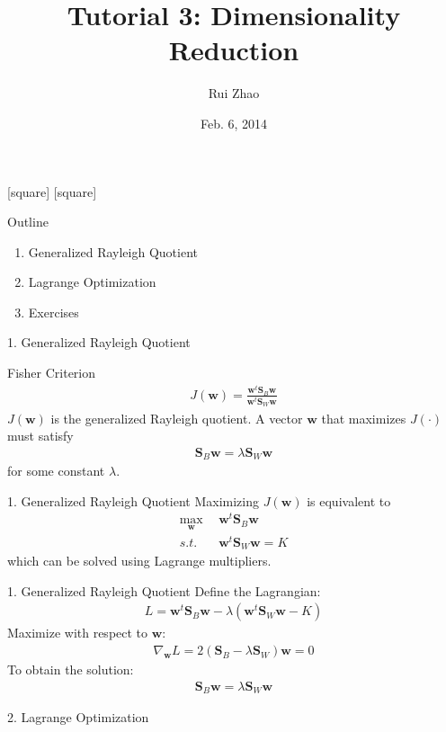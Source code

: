 \documentclass[compress,blue]{beamer}
\title[ENGG 5202 Pattern Recogntion Tutorial 3]{Tutorial 3: Dimensionality Reduction}
\author{Rui Zhao}
\institute{rzhao@ee.cuhk.edu.hk}
\date{Feb. 6, 2014}
\newcommand{\bw}{\mathbf{w}}
\newcommand{\bS}{\mathbf{S}}
\begin{document}
\begin{frame}
\titlepage
\end{frame}

[square]
[square]

\begin{frame}{Outline}
	\begin{enumerate}
		\item<1-2> Generalized Rayleigh Quotient 
		\vspace{0.1in}
		\item<1> Lagrange Optimization
		\vspace{0.1in}
		\item<1> Exercises 
	\end{enumerate}
\end{frame}

\begin{frame}{1. Generalized Rayleigh Quotient }
	\begin{block}{Fisher Criterion}
		\begin{align}
			J(\bw) = \frac{\bw^t  \bS_B \bw}{\bw^t \bS_W \bw}
		\end{align}
		$J(\bw)$ is the generalized Rayleigh quotient. A vector $\bw$ that maximizes $J(\cdot)$ must satisfy 
		\begin{align}
			\bS_B\bw = \lambda\bS_W\bw
		\end{align}
		for some constant $\lambda$.
	\end{block}	
\end{frame}

\begin{frame}{1. Generalized Rayleigh Quotient}
	Maximizing $J(\bw)$ is equivalent to 
	\begin{align}
		\max_{\bw} ~~& \bw^t \bS_B \bw \\
		s.t. ~~~& \bw^t \bS_W \bw = K
	\end{align}
	which can be solved using Lagrange multipliers.
\end{frame}

\begin{frame}{1. Generalized Rayleigh Quotient}
	Define the 	Lagrangian:
	\begin{align}
		L = \bw^t\bS_B\bw - \lambda (\bw^t \bS_W \bw - K)
	\end{align} 
	Maximize with respect to $\bw$:
	\begin{align}
		\nabla_{\bw}L = 2(\bS_B - \lambda\bS_W)\bw = 0
	\end{align}
	To obtain the solution:
	\begin{align}
		\bS_B\bw = \lambda \bS_W\bw
	\end{align}
\end{frame}

\begin{frame}{2. Lagrange Optimization}
	
\end{frame}
\end{document}
